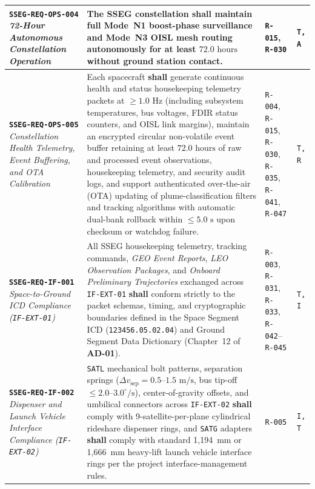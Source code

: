 \documentclass[11pt,a4paper]{article}
\providecommand{\abbr}[1]{#1}
\begin{document}
{\begin{longtable}{|>{\raggedright\arraybackslash}p{}|>{\raggedright\arraybackslash}p{}|>{\raggedright\arraybackslash}p{}|>{\raggedright\arraybackslash}p{}|}
\textbf{\texttt{SSEG-REQ-OPS-004}} \newline \emph{72-Hour Autonomous Constellation Operation} & The \abbr{SSEG} constellation \textbf{shall} maintain full Mode~N1 boost-phase surveillance and Mode~N3 \abbr{OISL} mesh routing autonomously for at least $72.0\text{ hours}$ without ground station contact. & \texttt{R-015}, \newline \texttt{R-030} & \texttt{T, A} \\ \hline
\textbf{\texttt{SSEG-REQ-OPS-005}} \newline \emph{Constellation Health Telemetry, Event Buffering, and OTA Calibration} & Each spacecraft \textbf{shall} generate continuous health and status housekeeping telemetry packets at $\ge 1.0\text{ Hz}$ (including subsystem temperatures, bus voltages, \abbr{FDIR} status counters, and \abbr{OISL} link margins), maintain an encrypted circular non-volatile event buffer retaining at least $72.0\text{ hours}$ of raw and processed event observations, housekeeping telemetry, and security audit logs, and support authenticated over-the-air (\abbr{OTA}) updating of plume-classification filters and tracking algorithms with automatic dual-bank rollback within $\le 5.0\text{ s}$ upon checksum or watchdog failure. & \texttt{R-004}, \texttt{R-015}, \texttt{R-030}, \texttt{R-035}, \texttt{R-041}, \texttt{R-047} & \texttt{T, R} \\ \hline
\textbf{\texttt{SSEG-REQ-IF-001}} \newline \emph{Space-to-Ground} \newline \emph{ICD Compliance (\texttt{IF-EXT-01})} & All \abbr{SSEG} housekeeping telemetry, tracking commands, \emph{GEO Event Reports}, \emph{LEO Observation Packages}, and \emph{Onboard Preliminary Trajectories} exchanged across \texttt{IF-EXT-01} \textbf{shall} conform strictly to the packet schemas, timing, and cryptographic boundaries defined in the Space Segment \abbr{ICD} (\texttt{123456.05.02.04}) and Ground Segment Data Dictionary (Chapter~12 of \textbf{AD-01}). & \texttt{R-003}, \texttt{R-031}, \texttt{R-033}, \texttt{R-042}--\texttt{R-045} & \texttt{T, I} \\ \hline
\textbf{\texttt{SSEG-REQ-IF-002}} \newline \emph{Dispenser and Launch Vehicle Interface Compliance (\texttt{IF-EXT-02})} & \texttt{SATL} mechanical bolt patterns, separation springs ($\Delta v_{\text{sep}} = 0.5\text{--}1.5\text{ m/s}$, bus tip-off $\le 2.0\text{--}3.0^\circ/\text{s}$), center-of-gravity offsets, and umbilical connectors across \texttt{IF-EXT-02} \textbf{shall} comply with 9-satellite-per-plane cylindrical rideshare dispenser rings, and \texttt{SATG} adapters \textbf{shall} comply with standard 1,194~mm or 1,666~mm heavy-lift launch vehicle interface rings per the project interface-management rules. & \texttt{R-005} & \texttt{I, T} \\ \hline

\end{longtable}}
\end{document}
